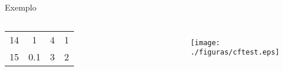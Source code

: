 {\begin{block}{Exemplo}
\begin{columns}[c]
\begin{table}
\begin{tabular}{cccc}
\\
14                & 1                   & 4                 & 1                 
 
\\
15                & 0.1                 & 3                 & 2                 
 
\\ \hline
\end{tabular}    
 \end{table}

     \begin{figure}
	\centering
	    \texttt{[image: ./figuras/cftest.eps]}
	  \end{figure} 
   
    \end{columns}

      \end{block}

}

